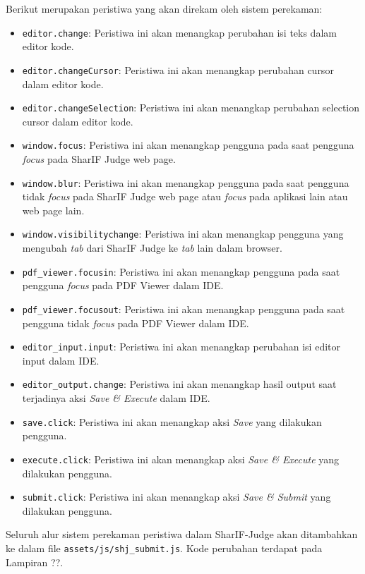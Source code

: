 Berikut merupakan peristiwa yang akan direkam oleh sistem perekaman:
\begin{itemize}
    \item \verb|editor.change|: Peristiwa ini akan menangkap perubahan isi teks dalam editor kode.
    \item \verb|editor.changeCursor|: Peristiwa ini akan menangkap perubahan cursor dalam editor kode. 
    \item \verb|editor.changeSelection|: Peristiwa ini akan menangkap perubahan selection cursor dalam editor kode.
    \item \verb|window.focus|: Peristiwa ini akan menangkap pengguna pada saat pengguna \textit{focus} pada SharIF Judge web page. 
    \item \verb|window.blur|: Peristiwa ini akan menangkap pengguna pada saat pengguna tidak \textit{focus} pada SharIF Judge web page atau \textit{focus} pada aplikasi lain atau web page lain.
    \item \verb|window.visibilitychange|: Peristiwa ini akan menangkap pengguna yang mengubah \textit{tab} dari SharIF Judge ke \textit{tab} lain dalam browser.
    \item \verb|pdf_viewer.focusin|: Peristiwa ini akan menangkap pengguna pada saat pengguna \textit{focus} pada PDF Viewer dalam IDE.
    \item \verb|pdf_viewer.focusout|: Peristiwa ini akan menangkap pengguna pada saat pengguna tidak \textit{focus} pada PDF Viewer dalam IDE.
    \item \verb|editor_input.input|: Peristiwa ini akan menangkap perubahan isi editor input dalam IDE. 
    \item \verb|editor_output.change|: Peristiwa ini akan menangkap hasil output saat terjadinya aksi \textit{Save \& Execute} dalam IDE.
    \item \verb|save.click|: Peristiwa ini akan menangkap aksi \textit{Save} yang dilakukan pengguna.
    \item \verb|execute.click|: Peristiwa ini akan menangkap aksi \textit{Save \& Execute} yang dilakukan pengguna.
    \item \verb|submit.click|: Peristiwa ini akan menangkap aksi \textit{Save \& Submit} yang dilakukan pengguna.
\end{itemize}

Seluruh alur sistem perekaman peristiwa dalam SharIF-Judge akan ditambahkan ke dalam file \verb|assets/js/|\verb|shj_submit.js|. Kode perubahan terdapat pada Lampiran ??.

